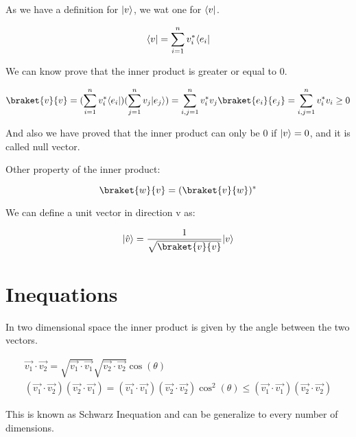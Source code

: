 As we have a definition for $\lvert v\rangle$, we wat one for $\langle v\rvert$.

\begin{equation}
  \label{6.5}
  \langle v\rvert = \sum_{i=1}^{n} v_i^{*}\langle e_i\rvert
\end{equation}

We can know prove that the inner product is greater or equal to 0.

\begin{equation}
  \label{6.6}
  \braket{v}{v} = (\sum_{i=1}^{n} v_i^{*}\bra{e_i})(\sum_{j=1}^{n} v_j \ket{e_j}) = \sum_{i,j=1}^{n} v_i^{*} v_j \braket{e_i}{e_j} = \sum_{i,j=1}^{n} v_i^{*} v_i \geq 0
\end{equation}

And also we have proved that the inner product can only be 0 if $\lvert v\rangle = 0$, and it is called null vector.

Other property of the inner product:


\begin{equation}
  \label{6.7}
  \braket{w}{v} = (\braket{v}{w})^{*}
\end{equation}

We can define a unit vector in direction v as:

\begin{equation}
  \label{6.8}
\ket{\hat{v}} = \frac{1}{\sqrt{\braket{v}{v}}} \ket{v}
\end{equation}

\section{Inequations}

In two dimensional space the inner product is given by the angle between the two vectors.

\begin{equation}
  \label{6.9}
  \begin{array}{c}
    \vec{v_1} \cdot \vec{v_2} = \sqrt{\vec{v_1}\cdot\vec{v_1}} \sqrt{\vec{v_2}\cdot\vec{v_2}} \cos(\theta)
    \\
    (\vec{v_1} \cdot \vec{v_2})(\vec{v_2} \cdot \vec{v_1}) = (\vec{v_1}\cdot\vec{v_1})  (\vec{v_2}\cdot\vec{v_2}) \cos^2(\theta) \leq (\vec{v_1}\cdot\vec{v_1})  (\vec{v_2}\cdot\vec{v_2})
  \end{array}
\end{equation}

This is known as Schwarz Inequation and can be generalize to every number of dimensions.

